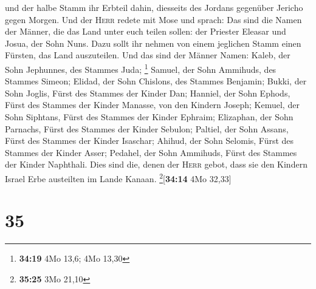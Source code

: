 und der halbe Stamm ihr Erbteil dahin, diesseits des Jordans gegenüber
Jericho gegen Morgen.  Und der \textsc{Herr} redete mit
Mose und sprach:  Das sind die Namen der Männer, die das
Land unter euch teilen sollen: der Priester Eleasar und Josua, der Sohn
Nuns.  Dazu sollt ihr nehmen von einem jeglichen Stamm
einen Fürsten, das Land auszuteilen.  Und das sind der
Männer Namen: Kaleb, der Sohn Jephunnes, des Stammes Juda; \footnote{\textbf{34:19}
  4Mo 13,6; 4Mo 13,30}  Samuel, der Sohn Ammihuds, des
Stammes Simeon;  Elidad, der Sohn Chislons, des Stammes
Benjamin;  Bukki, der Sohn Joglis, Fürst des Stammes der
Kinder Dan;  Hanniel, der Sohn Ephods, Fürst des Stammes
der Kinder Manasse, von den Kindern Joseph;  Kemuel, der
Sohn Siphtans, Fürst des Stammes der Kinder Ephraim; 
Elizaphan, der Sohn Parnachs, Fürst des Stammes der Kinder Sebulon;
 Paltiel, der Sohn Assans, Fürst des Stammes der Kinder
Isaschar;  Ahihud, der Sohn Selomis, Fürst des Stammes
der Kinder Asser;  Pedahel, der Sohn Ammihuds, Fürst des
Stammes der Kinder Naphthali.  Dies sind die, denen der
\textsc{Herr} gebot, dass sie den Kindern Israel Erbe austeilten im
Lande Kanaan. \footnote{\textbf{35:25} 3Mo 21,10}{[}\textbf{34:14} 4Mo
32,33{]}

\hypertarget{section-34}{%
\section{35}\label{section-34}}


